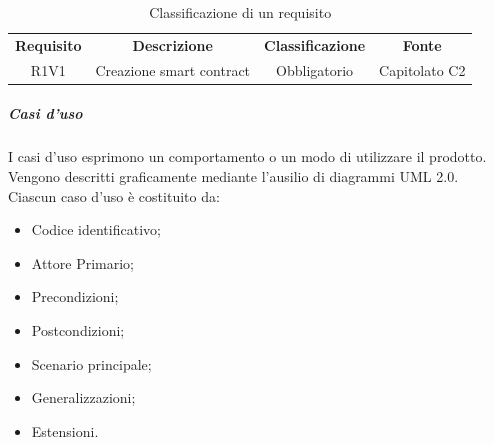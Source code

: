             \begin{table}[H]
              \centering
              \renewcommand{\arraystretch}{1.8}
              \begin{tabular}{cccc}
                \rowcolor[HTML]{125E28} 
                \color[HTML]{FFFFFF}\textbf{Requisito}
              & \color[HTML]{FFFFFF}\textbf{Descrizione} 
              & \color[HTML]{FFFFFF}\textbf{Classificazione} 
              & \color[HTML]{FFFFFF}\textbf{Fonte}\\
            
                R1V1  &  Creazione smart contract  &  Obbligatorio  &  Capitolato C2\\    
            
              \end{tabular}
              \caption{Classificazione di un requisito}
            \end{table}
                        
            \subparagraph{Casi d'uso} \label{subparagraph:Casi d'uso}
            I casi d'uso esprimono un comportamento o un modo di utilizzare il prodotto.\\
            Vengono descritti graficamente mediante l'ausilio di diagrammi UML 2.0.\\
            Ciascun caso d'uso è costituito da:
            \begin{itemize}
                \item Codice identificativo;
                \item Attore Primario;
                \item Precondizioni;
                \item Postcondizioni;
                \item Scenario principale;
                \item Generalizzazioni;
                \item Estensioni.
            \end{itemize}

